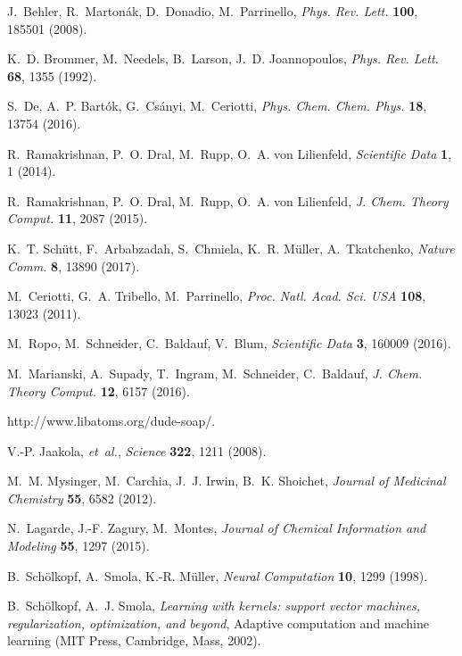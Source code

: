 \documentclass[12pt]{article}
\begin{document}
\begin{thebibliography}{10}
J.~Behler, R.~Marton{\'{a}}k, D.~Donadio, M.~Parrinello, {\it Phys. Rev.
  Lett.\/} {\bf 100}, 185501 (2008).

K.~D. Brommer, M.~Needels, B.~Larson, J.~D. Joannopoulos, {\it Phys. Rev.
  Lett.\/} {\bf 68}, 1355 (1992).

S.~De, A.~P. Bart{\'{o}}k, G.~Cs{\'{a}}nyi, M.~Ceriotti, {\it Phys. Chem. Chem.
  Phys.\/} {\bf 18}, 13754 (2016).

R.~Ramakrishnan, P.~O. Dral, M.~Rupp, O.~A. von Lilienfeld, {\it Scientific
  Data\/} {\bf 1}, 1 (2014).

R.~Ramakrishnan, P.~O. Dral, M.~Rupp, O.~A. von Lilienfeld, {\it J. Chem.
  Theory Comput.\/} {\bf 11}, 2087 (2015).

K.~T. Sch{\"{u}}tt, F.~Arbabzadah, S.~Chmiela, K.~R. M{\"{u}}ller,
  A.~Tkatchenko, {\it Nature Comm.\/} {\bf 8}, 13890 (2017).

M.~Ceriotti, G.~A. Tribello, M.~Parrinello, {\it Proc. Natl. Acad. Sci. USA\/}
  {\bf 108}, 13023 (2011).

M.~Ropo, M.~Schneider, C.~Baldauf, V.~Blum, {\it Scientific Data\/} {\bf 3},
  160009 (2016).

M.~Marianski, A.~Supady, T.~Ingram, M.~Schneider, C.~Baldauf, {\it J. Chem.
  Theory Comput.\/} {\bf 12}, 6157 (2016).

http://www.libatoms.org/dude-soap/.

V.-P. Jaakola, {\it et~al.\/}, {\it Science\/} {\bf 322}, 1211 (2008).

M.~M. Mysinger, M.~Carchia, J.~J. Irwin, B.~K. Shoichet, {\it Journal of
  Medicinal Chemistry\/} {\bf 55}, 6582 (2012).

N.~Lagarde, J.-F. Zagury, M.~Montes, {\it Journal of Chemical Information and
  Modeling\/} {\bf 55}, 1297 (2015).

B.~Sch{\"{o}}lkopf, A.~Smola, K.-R. M{\"{u}}ller, {\it Neural Computation\/}
  {\bf 10}, 1299 (1998).

B.~Sch{\"o}lkopf, A.~J. Smola, {\it Learning with kernels: support vector
  machines, regularization, optimization, and beyond\/}, Adaptive computation
  and machine learning (MIT Press, Cambridge, Mass, 2002).


\end{thebibliography}
\end{document}
